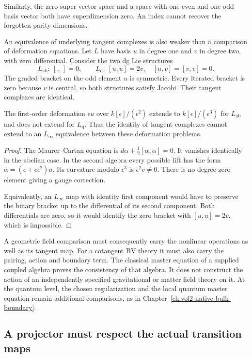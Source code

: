 Similarly, the zero super vector space and a space with one even
and one odd basis vector both have superdimension zero.
An index cannot recover the forgotten parity dimensions.

An equivalence of underlying tangent complexes is also weaker
than a comparison of deformation equations.
Let $L$ have basis $u$ in degree one and $v$ in degree two, with
zero differential.
Consider the two dg Lie structures
\[
 L_{\mathrm{ab}}:\ [\, ,\,]=0,\qquad
 L_{\mathrm{q}}:\ [u,u]=2v,\quad [u,v]=[v,v]=0.
\]
The graded bracket on the odd element $u$ is symmetric.
Every iterated bracket is zero because $v$ is central, so both
structures satisfy Jacobi.
Their tangent complexes are identical.

\begin{proposition}\label{prop:vol2-nonlinear-comparison}
The first-order deformation $\epsilon u$ over
$k[\epsilon]/(\epsilon^2)$ extends to
$k[\epsilon]/(\epsilon^3)$ for $L_{\mathrm{ab}}$ and does not
extend for $L_{\mathrm{q}}$.
Thus the identity of tangent complexes cannot extend to an
$L_\infty$ equivalence between these deformation problems.
\end{proposition}
\begin{proof}
The Maurer--Cartan equation is
$d\alpha+\tfrac12[\alpha,\alpha]=0$.
It vanishes identically in the abelian case.
In the second algebra every possible lift has the form
$\alpha=(\epsilon+c\epsilon^2)u$.
Its curvature modulo $\epsilon^3$ is $\epsilon^2v\ne0$.
There is no degree-zero element giving a gauge correction.

Equivalently, an $L_\infty$ map with identity first component
would have to preserve the binary bracket up to the differential
of its second component.
Both differentials are zero, so it would identify the zero
bracket with $[u,u]=2v$, which is impossible.
\end{proof}

A geometric field comparison must consequently carry the nonlinear
operations as well as its tangent map.
For a cotangent BV theory it must also carry the pairing, action
and boundary term.
The classical master equation of a supplied coupled algebra proves
the consistency of that algebra.
It does not construct the action of an independently specified
gravitational or matter field theory on it.
At the quantum level, the chosen regularization and the local
quantum master equation remain additional comparisons, as in
Chapter~\ref{ch:vol2-native-bulk-boundary}.

\subsection{A projector must respect the actual transition maps}


